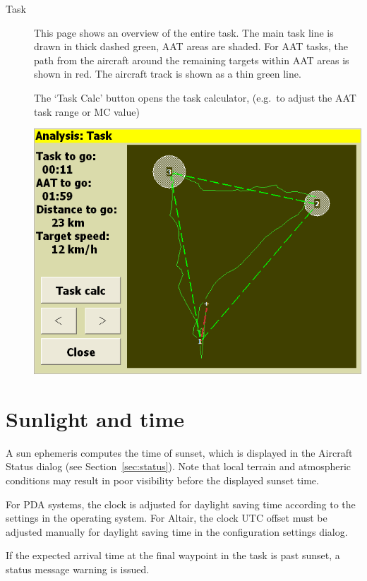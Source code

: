 \begin{description}
\item[Task]
  This page shows an overview of the entire task.  The main task line
  is drawn in thick dashed green, AAT areas are shaded.  For AAT
  tasks, the path from the aircraft around the remaining targets within AAT
  areas is shown in red.  The aircraft track is shown as a thin green line.

  The `Task Calc' button opens the task calculator,
  (e.g.\ to adjust the AAT task range or MC value)

\begin{center}
\includegraphics[angle=0,width=0.8\linewidth,keepaspectratio='true']{figures/analysis-task.png}
\end{center}

\end{description}

\section{Sunlight and time}

A sun ephemeris computes the time of sunset, which is displayed in the
Aircraft Status dialog (see Section~\ref{sec:status}).  Note that
local terrain and atmospheric conditions may result in poor visibility
before the displayed sunset time.

For PDA systems, the clock is adjusted for daylight saving time according
to the settings in the operating system.  For Altair, the clock UTC offset
must be adjusted manually for daylight saving time in the configuration
settings dialog.

If the expected arrival time at the final waypoint in the task is past
sunset, a status message warning is issued.
